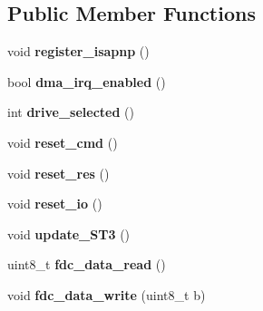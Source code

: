 \subsection*{Public Member Functions}
\begin{DoxyCompactItemize}
\item 
\hypertarget{classFloppyController_ae1ec5aecdbb6827820d71c1aa3c8c6ea}{void {\bfseries register\-\_\-isapnp} ()}\label{classFloppyController_ae1ec5aecdbb6827820d71c1aa3c8c6ea}

\item 
\hypertarget{classFloppyController_a23b337cff8f90aaceea06437e3b3dda1}{bool {\bfseries dma\-\_\-irq\-\_\-enabled} ()}\label{classFloppyController_a23b337cff8f90aaceea06437e3b3dda1}

\item 
\hypertarget{classFloppyController_a060c236b8fc3646559fbaec26138f7d2}{int {\bfseries drive\-\_\-selected} ()}\label{classFloppyController_a060c236b8fc3646559fbaec26138f7d2}

\item 
\hypertarget{classFloppyController_a77a9c2f03d6f823258dc21425be2bbf0}{void {\bfseries reset\-\_\-cmd} ()}\label{classFloppyController_a77a9c2f03d6f823258dc21425be2bbf0}

\item 
\hypertarget{classFloppyController_a86d00f09b49a11f32b659893f29ec4bf}{void {\bfseries reset\-\_\-res} ()}\label{classFloppyController_a86d00f09b49a11f32b659893f29ec4bf}

\item 
\hypertarget{classFloppyController_a1a8b406643b99f91479993963c65efd2}{void {\bfseries reset\-\_\-io} ()}\label{classFloppyController_a1a8b406643b99f91479993963c65efd2}

\item 
\hypertarget{classFloppyController_a72b59cb487b088ab236701a74e3f223e}{void {\bfseries update\-\_\-\-S\-T3} ()}\label{classFloppyController_a72b59cb487b088ab236701a74e3f223e}

\item 
\hypertarget{classFloppyController_af66f11dac96a180777cb40119170558a}{uint8\-\_\-t {\bfseries fdc\-\_\-data\-\_\-read} ()}\label{classFloppyController_af66f11dac96a180777cb40119170558a}

\item 
\hypertarget{classFloppyController_a286e6697307521d2359f8f17ae53b30b}{void {\bfseries fdc\-\_\-data\-\_\-write} (uint8\-\_\-t b)}\label{classFloppyController_a286e6697307521d2359f8f17ae53b30b}


\end{DoxyCompactItemize}
